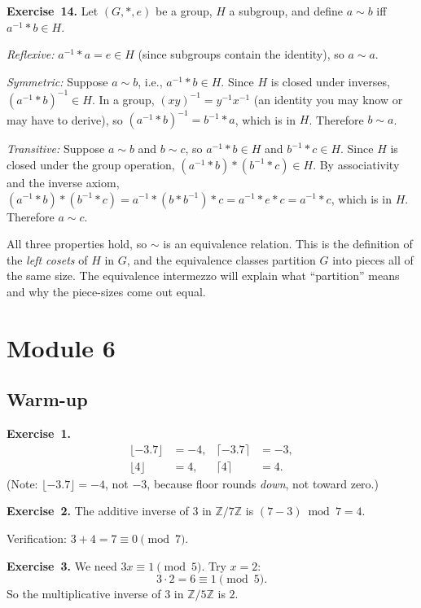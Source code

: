\documentclass[11pt]{article}
\begin{document}
\medskip
\textbf{Exercise~14.}
Let $(G, *, e)$ be a group, $H$ a subgroup, and define $a \sim b$ iff $a^{-1} * b \in H$.

\emph{Reflexive:} $a^{-1} * a = e \in H$ (since subgroups contain the identity), so $a \sim a$.

\emph{Symmetric:} Suppose $a \sim b$, i.e., $a^{-1} * b \in H$. Since $H$ is closed under inverses, $(a^{-1} * b)^{-1} \in H$. In a group, $(xy)^{-1} = y^{-1}x^{-1}$ (an identity you may know or may have to derive), so $(a^{-1} * b)^{-1} = b^{-1} * a$, which is in $H$. Therefore $b \sim a$.

\emph{Transitive:} Suppose $a \sim b$ and $b \sim c$, so $a^{-1} * b \in H$ and $b^{-1} * c \in H$. Since $H$ is closed under the group operation, $(a^{-1} * b) * (b^{-1} * c) \in H$. By associativity and the inverse axiom, $(a^{-1} * b) * (b^{-1} * c) = a^{-1} * (b * b^{-1}) * c = a^{-1} * e * c = a^{-1} * c$, which is in $H$. Therefore $a \sim c$.

All three properties hold, so $\sim$ is an equivalence relation. This is the definition of the \emph{left cosets} of $H$ in $G$, and the equivalence classes partition $G$ into pieces all of the same size. The equivalence intermezzo will explain what ``partition'' means and why the piece-sizes come out equal.

\section*{Module 6}

\subsection*{Warm-up}

\textbf{Exercise~1.}
\begin{align*}
  \lfloor -3.7 \rfloor &= -4, &
  \lceil -3.7 \rceil &= -3, \\
  \lfloor 4 \rfloor &= 4, &
  \lceil 4 \rceil &= 4.
\end{align*}
(Note: $\lfloor -3.7 \rfloor = -4$, not $-3$, because floor rounds
\emph{down}, not toward zero.)

\medskip
\textbf{Exercise~2.}
The additive inverse of $3$ in $\mathbb{Z}/7\mathbb{Z}$ is
$(7 - 3) \bmod 7 = 4$.

Verification: $3 + 4 = 7 \equiv 0 \pmod 7$. \checkmark

\medskip
\textbf{Exercise~3.}
We need $3x \equiv 1 \pmod 5$. Try $x = 2$:
\[
  3 \cdot 2 = 6 \equiv 1 \pmod 5.
\]
So the multiplicative inverse of $3$ in $\mathbb{Z}/5\mathbb{Z}$ is $2$.
\end{document}
